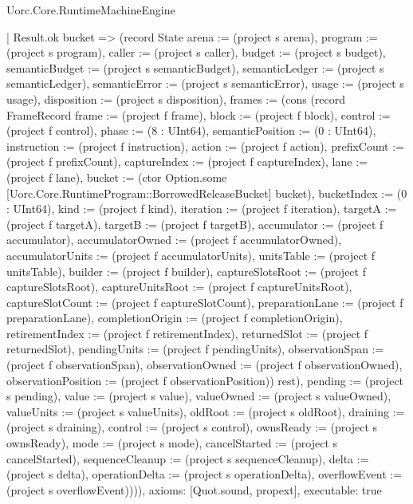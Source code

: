 \begin{lexlean}{Uorc.Core.RuntimeMachineEngine}
\begin{semanticmodule}
{      | Result.ok bucket => (record State {arena := (project s arena), program := (project s program), caller := (project s caller), budget := (project s budget), semanticBudget := (project s semanticBudget), semanticLedger := (project s semanticLedger), semanticError := (project s semanticError), usage := (project s usage), disposition := (project s disposition), frames := (cons (record FrameRecord {frame := (project f frame), block := (project f block), control := (project f control), phase := (8 : UInt64), semanticPosition := (0 : UInt64), instruction := (project f instruction), action := (project f action), prefixCount := (project f prefixCount), captureIndex := (project f captureIndex), lane := (project f lane), bucket := (ctor Option.some [Uorc.Core.RuntimeProgram::BorrowedReleaseBucket] bucket), bucketIndex := (0 : UInt64), kind := (project f kind), iteration := (project f iteration), targetA := (project f targetA), targetB := (project f targetB), accumulator := (project f accumulator), accumulatorOwned := (project f accumulatorOwned), accumulatorUnits := (project f accumulatorUnits), unitsTable := (project f unitsTable), builder := (project f builder), captureSlotsRoot := (project f captureSlotsRoot), captureUnitsRoot := (project f captureUnitsRoot), captureSlotCount := (project f captureSlotCount), preparationLane := (project f preparationLane), completionOrigin := (project f completionOrigin), retirementIndex := (project f retirementIndex), returnedSlot := (project f returnedSlot), pendingUnits := (project f pendingUnits), observationSpan := (project f observationSpan), observationOwned := (project f observationOwned), observationPosition := (project f observationPosition)}) rest), pending := (project s pending), value := (project s value), valueOwned := (project s valueOwned), valueUnits := (project s valueUnits), oldRoot := (project s oldRoot), draining := (project s draining), control := (project s control), ownsReady := (project s ownsReady), mode := (project s mode), cancelStarted := (project s cancelStarted), sequenceCleanup := (project s sequenceCleanup), delta := (project s delta), operationDelta := (project s operationDelta), overflowEvent := (project s overflowEvent)}))),
  axioms: [Quot.sound, propext],
  executable: true
}


\end{semanticmodule}
\end{lexlean}
